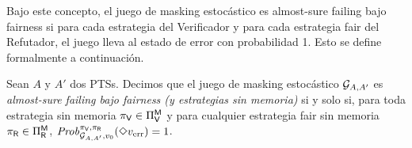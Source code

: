 
Bajo este concepto, el juego de masking estocástico es almost-sure failing
bajo fairness si para cada estrategia del Verificador y para cada estrategia fair del Refutador, el juego lleva al estado de error con probabilidad 1. Esto se define formalmente a continuación.



\begin{definition}
  Sean $A$ y $A'$ dos PTSs. Decimos que el juego de masking estocástico $\mathcal{G}_{A,A'}$ es \emph{almost-sure failing bajo fairness
  (y estrategias sin memoria)} si y solo si, para toda estrategia sin memoria
  $\pi_{\mathsf{V}} \in \Pi_{\mathsf{V}}^{\mathsf{M}}$ y para cualquier estrategia fair sin memoria
  $\pi_{\mathsf{R}} \in \Pi_{\mathsf{R}}^{\mathsf{M}}$,
  $\mathit{Prob}^{\pi_{\mathsf{V}}, \pi_{\mathsf{R}}}_{\mathcal{G}_{A,A'}, v_0}(\Diamond v_{\text{err}})=1$.
\end{definition}





